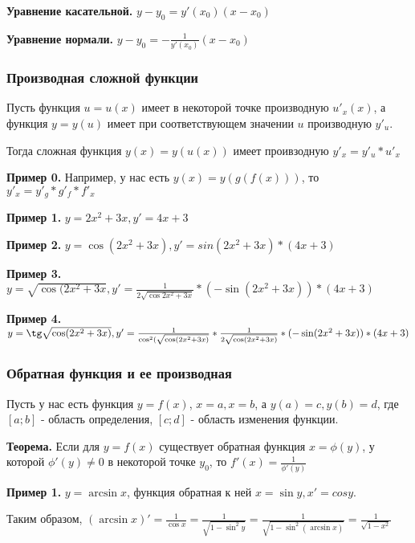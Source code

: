 \documentclass{article}
\begin{document}
\begin{flushleft}
\hfill

\textbf{Уравнение касательной.} $y - y_0 = y'(x_0)(x - x_0)$

\hfill

\textbf{Уравнение нормали.} $y - y_0 = -\frac{1}{y'(x_0)} (x - x_0)$

\subsubsection{Производная сложной функции}

Пусть функция $u = u(x)$ имеет в некоторой точке производную $u'_x(x)$, а функция $y = y(u)$ имеет при соответствующем значении $u$ производную $y'_u$.

Тогда сложная функция $y(x) = y(u(x))$ имеет проивзодную $y'_x = y'_u * u'_x$

\hfill

\textbf{Пример 0.} Например, у нас есть $y(x) = y(g(f(x)))$, то $y'_x = y'_g * g'_f * f'_x$

\hfill

\textbf{Пример 1.} $y = 2x^2 + 3x, y' = 4x + 3$

\hfill

\textbf{Пример 2.} $y = \cos (2x^2 + 3x), y' = sin (2x^2 + 3x) * (4x + 3)$

\hfill

\textbf{Пример 3.} $y = \sqrt{\cos{(2x^2 + 3x}}, y' = \frac{1}{2\sqrt{\cos{2x^2 + 3x}}} * (-\sin (2x^2 + 3x)) * (4x + 3)$

\hfill

\textbf{Пример 4.} $y = \tg \sqrt{\cos (2x^2 + 3x)}, y' = \frac{1}{\cos^2 (\sqrt{\cos (2x^2 + 3x)}} * \frac{1}{2 \sqrt{\cos (2x^2 + 3x)}} * (-\sin (2x^2 + 3x)) * (4x + 3)$

\subsubsection{Обратная функция и ее производная}

Пусть у нас есть функция $y = f(x)$, $x = a, x = b$, а $y(a) = c, y(b) = d$, где $[a; b]$ - область определения,  $[c; d]$ - область изменения функции.

\hfill

\textbf{Теорема.} Если для $y = f(x)$ существует обратная функция $x = \phi (y)$, у которой $\phi'(y) \ne 0$ в некоторой точке $y_0$, то $f'(x) = \frac{1}{\phi'(y)}$

\hfill

\textbf{Пример 1.} $y = \arcsin x$, функция обратная к ней $x = \sin y, x' = cos y$.

Таким образом, $(\arcsin x)' = \frac{1}{\cos x} = \frac{1}{\sqrt{1 - \sin^2 y}} = \frac{1}{\sqrt{1 - \sin^2(\arcsin x)}} = \frac{1}{\sqrt{1 - x^2}}$

\end{flushleft}
\end{document}
